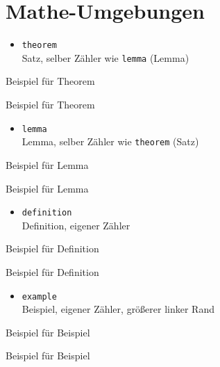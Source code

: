\section*{Mathe-Umgebungen}
\begin{itemize}
	\item \verb|theorem|\\
		\glqq{}Satz\grqq{}, selber Zähler wie \verb|lemma| (Lemma)
\end{itemize}
\begin{verbatimtab}
	\begin{theorem}
		Beispiel für Theorem
	\end{theorem}
\end{verbatimtab}
\begin{theorem}
	Beispiel für Theorem
\end{theorem}
\begin{itemize}
	\item \verb|lemma|\\
		\glqq{}Lemma\grqq{}, selber Zähler wie \verb|theorem| (Satz)
\end{itemize}
\begin{verbatimtab}
	\begin{lemma}
		Beispiel für Lemma
	\end{lemma}
\end{verbatimtab}
\begin{lemma}
	Beispiel für Lemma
\end{lemma}
\begin{itemize}
	\item \verb|definition|\\
		\glqq{}Definition\grqq{}, eigener Zähler
\end{itemize}
\begin{verbatimtab}
	\begin{definition}
		Beispiel für Definition
	\end{definition}
\end{verbatimtab}
\begin{definition}
	Beispiel für Definition
\end{definition}
\begin{itemize}
	\item \verb|example|\\
		\glqq{}Beispiel\grqq{}, eigener Zähler, größerer linker Rand
\end{itemize}
\begin{verbatimtab}
\begin{example}
	Beispiel für Beispiel
\end{example}
\end{verbatimtab}
\begin{example}
	Beispiel für Beispiel
\end{example}


